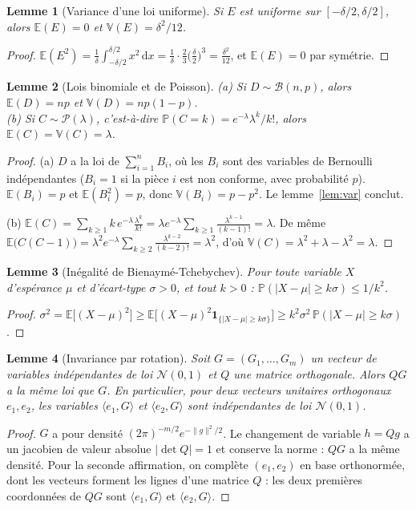 \documentclass[11pt,a4paper]{article}
\theoremstyle{tq}
\newtheorem{lem}{Lemme}
\theoremstyle{remark}
\newcommand{\E}{\mathbb{E}}
\newcommand{\V}{\mathbb{V}}
\renewcommand{\P}{\mathbb{P}}
\newcommand{\N}{\mathcal{N}}
\newcommand{\dd}{\,\mathrm{d}}
\begin{document}
\begin{lem}[Variance d'une loi uniforme]\label{lem:unif}
Si $E$ est uniforme sur $[-\delta/2,\delta/2]$, alors $\E(E)=0$ et $\V(E)=\delta^2/12$.
\end{lem}
\begin{proof}
$\E(E^2)=\frac1\delta\int_{-\delta/2}^{\delta/2}x^2\dd x=\frac1\delta\cdot\frac{2}{3}\Big(\frac\delta2\Big)^3=\frac{\delta^2}{12}$, et $\E(E)=0$ par symétrie.
\end{proof}

\begin{lem}[Lois binomiale et de Poisson]\label{lem:binpois}
(a) Si $D\sim\mathcal B(n,p)$, alors $\E(D)=np$ et $\V(D)=np(1-p)$.\\
(b) Si $C\sim\mathcal P(\lambda)$, c'est-à-dire $\P(C=k)=e^{-\lambda}\lambda^k/k!$, alors $\E(C)=\V(C)=\lambda$.
\end{lem}
\begin{proof}
(a) $D$ a la loi de $\sum_{i=1}^nB_i$, où les $B_i$ sont des variables de Bernoulli indépendantes ($B_i=1$ si la pièce $i$ est non conforme, avec probabilité $p$). $\E(B_i)=p$ et $\E(B_i^2)=p$, donc $\V(B_i)=p-p^2$. Le lemme~\ref{lem:var} conclut.

(b) $\E(C)=\sum_{k\ge1}k\,e^{-\lambda}\frac{\lambda^k}{k!}=\lambda e^{-\lambda}\sum_{k\ge1}\frac{\lambda^{k-1}}{(k-1)!}=\lambda$. De même $\E\big(C(C-1)\big)=\lambda^2e^{-\lambda}\sum_{k\ge2}\frac{\lambda^{k-2}}{(k-2)!}=\lambda^2$, d'où $\V(C)=\lambda^2+\lambda-\lambda^2=\lambda$.
\end{proof}

\begin{lem}[Inégalité de Bienaymé-Tchebychev]\label{lem:BT}
Pour toute variable $X$ d'espérance $\mu$ et d'écart-type $\sigma>0$, et tout $k>0$ : $\P(|X-\mu|\ge k\sigma)\le 1/k^2$.
\end{lem}
\begin{proof}
$\sigma^2=\E\big[(X-\mu)^2\big]\ge\E\big[(X-\mu)^2\mathbf 1_{\{|X-\mu|\ge k\sigma\}}\big]\ge k^2\sigma^2\,\P(|X-\mu|\ge k\sigma)$.
\end{proof}

\begin{lem}[Invariance par rotation]\label{lem:rot}
Soit $G=(G_1,\dots,G_m)$ un vecteur de variables indépendantes de loi $\N(0,1)$ et $Q$ une matrice orthogonale. Alors $QG$ a la même loi que $G$. En particulier, pour deux vecteurs unitaires orthogonaux $e_1,e_2$, les variables $\langle e_1,G\rangle$ et $\langle e_2,G\rangle$ sont indépendantes de loi $\N(0,1)$.
\end{lem}
\begin{proof}
$G$ a pour densité $(2\pi)^{-m/2}e^{-\|g\|^2/2}$. Le changement de variable $h=Qg$ a un jacobien de valeur absolue $|\det Q|=1$ et conserve la norme : $QG$ a la même densité. Pour la seconde affirmation, on complète $(e_1,e_2)$ en base orthonormée, dont les vecteurs forment les lignes d'une matrice $Q$ : les deux premières coordonnées de $QG$ sont $\langle e_1,G\rangle$ et $\langle e_2,G\rangle$.
\end{proof}
\end{document}
